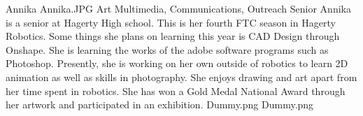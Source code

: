 \insertbio
{Annika}
{Annika.JPG}
{Art}
{Multimedia, Communications, Outreach}
{Senior}
{
Annika is a senior at Hagerty High school. This is her fourth FTC season in Hagerty Robotics. Some things she plans on learning this year is CAD Design through Onshape. She is learning the works of the adobe software programs such as Photoshop. Presently, she is working on her own outside of robotics to learn 2D animation as well as skills in photography.  She enjoys drawing and art apart from her time spent in robotics. She has won a Gold Medal National Award through her artwork and participated in an exhibition.
}
{Dummy.png}
{Dummy.png}